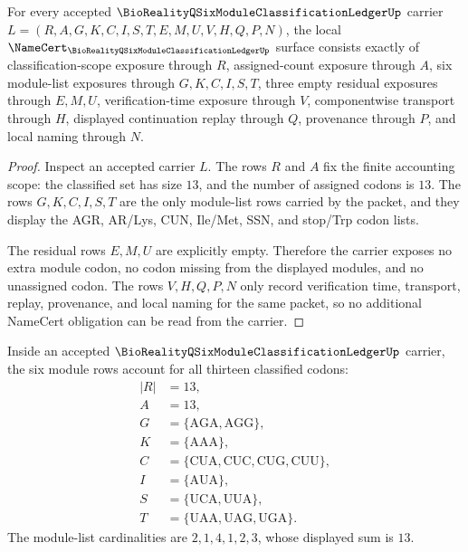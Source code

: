 \begin{theorem}
\label{thm:bioreality-q-six-module-classification-ledger-namecert-obligations}
For every accepted $\BioRealityQSixModuleClassificationLedgerUp$ carrier $L=(R,A,G,K,C,I,S,T,E,M,U,V,H,Q,P,N)$, the local $\NameCert_{\BioRealityQSixModuleClassificationLedgerUp}$ surface consists exactly of classification-scope exposure through $R$, assigned-count exposure through $A$, six module-list exposures through $G,K,C,I,S,T$, three empty residual exposures through $E,M,U$, verification-time exposure through $V$, componentwise transport through $H$, displayed continuation replay through $Q$, provenance through $P$, and local naming through $N$.
\end{theorem}

\begin{proof}
Inspect an accepted carrier $L$. The rows $R$ and $A$ fix the finite accounting scope: the classified set has size $13$, and the number of assigned codons is $13$. The rows $G,K,C,I,S,T$ are the only module-list rows carried by the packet, and they display the AGR, AR/Lys, CUN, Ile/Met, SSN, and stop/Trp codon lists.

The residual rows $E,M,U$ are explicitly empty. Therefore the carrier exposes no extra module codon, no codon missing from the displayed modules, and no unassigned codon. The rows $V,H,Q,P,N$ only record verification time, transport, replay, provenance, and local naming for the same packet, so no additional NameCert obligation can be read from the carrier.
\end{proof}

\begin{theorem}
\label{thm:bioreality-q-six-module-classification-ledger-completion}
Inside an accepted $\BioRealityQSixModuleClassificationLedgerUp$ carrier, the six module rows account for all thirteen classified codons:
$$
\begin{aligned}
|R|&=13,\\
A&=13,\\
G&=\{\mathrm{AGA},\mathrm{AGG}\},\\
K&=\{\mathrm{AAA}\},\\
C&=\{\mathrm{CUA},\mathrm{CUC},\mathrm{CUG},\mathrm{CUU}\},\\
I&=\{\mathrm{AUA}\},\\
S&=\{\mathrm{UCA},\mathrm{UUA}\},\\
T&=\{\mathrm{UAA},\mathrm{UAG},\mathrm{UGA}\}.
\end{aligned}
$$
The module-list cardinalities are $2,1,4,1,2,3$, whose displayed sum is $13$.
\end{theorem}

